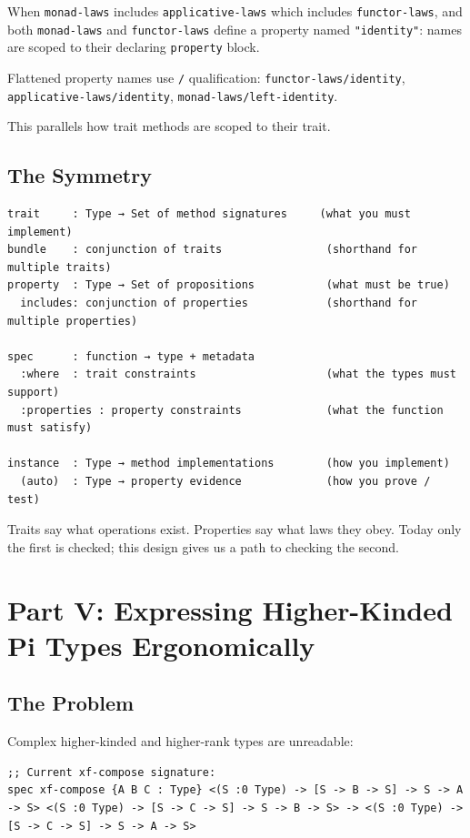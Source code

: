 \documentclass[11pt]{article}
\begin{document}
When \texttt{monad-laws} includes \texttt{applicative-laws} which includes \texttt{functor-laws},
and both \texttt{monad-laws} and \texttt{functor-laws} define a property named \texttt{"identity"}:
names are scoped to their declaring \texttt{property} block.

Flattened property names use \texttt{/} qualification:
\texttt{functor-laws/identity}, \texttt{applicative-laws/identity}, \texttt{monad-laws/left-identity}.

This parallels how trait methods are scoped to their trait.
\subsection{The Symmetry}
\label{sec:org7b72b98}

\begin{verbatim}
trait     : Type → Set of method signatures     (what you must implement)
bundle    : conjunction of traits                (shorthand for multiple traits)
property  : Type → Set of propositions           (what must be true)
  includes: conjunction of properties            (shorthand for multiple properties)

spec      : function → type + metadata
  :where  : trait constraints                    (what the types must support)
  :properties : property constraints             (what the function must satisfy)

instance  : Type → method implementations        (how you implement)
  (auto)  : Type → property evidence             (how you prove / test)
\end{verbatim}

Traits say what operations exist. Properties say what laws they obey. Today only
the first is checked; this design gives us a path to checking the second.
\section{Part V: Expressing Higher-Kinded Pi Types Ergonomically}
\label{sec:orgeeb260e}

\subsection{The Problem}
\label{sec:orgae55810}

Complex higher-kinded and higher-rank types are unreadable:

\begin{verbatim}
;; Current xf-compose signature:
spec xf-compose {A B C : Type} <(S :0 Type) -> [S -> B -> S] -> S -> A -> S> <(S :0 Type) -> [S -> C -> S] -> S -> B -> S> -> <(S :0 Type) -> [S -> C -> S] -> S -> A -> S>
\end{verbatim}
\end{document}
